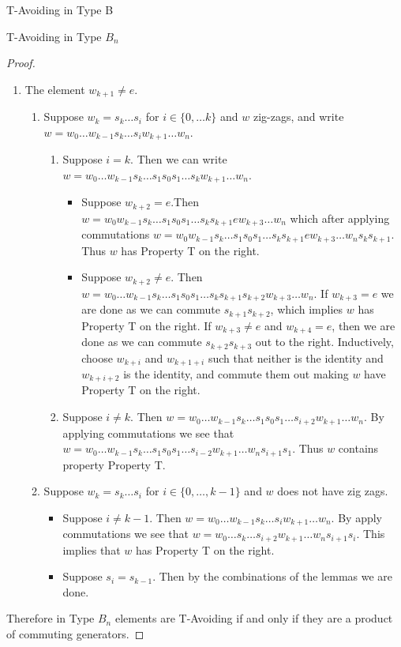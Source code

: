 \documentclass[11pt]{amsart}
\theoremstyle{definition}
\numberwithin{equation}{section}
\renewcommand{\(}{\left(}
\renewcommand{\)}{\right)}
\begin{document}
\begin{section}{T-Avoiding in Type B}
\begin{subsection}{T-Avoiding in Type $B_n$}
\begin{proof}
\begin{enumerate}
\begin{enumerate}
\begin{enumerate}
	\end{enumerate}
	\item The element $w_{k+1} \neq e$.
	\begin{enumerate}
	\item Suppose $w_k=s_k \ldots s_i$ for $i \in \{0, \ldots k\}$ and $w$ zig-zags, and write $w=w_0 \ldots w_{k-1} s_k \ldots s_i w_{k+1} \ldots w_n$.
	\begin{enumerate}
	\item Suppose $i=k$. Then we can write $w=w_0 \ldots w_{k-1} s_k \ldots s_1 s_0 s_1 \ldots s_k w_{k+1} \ldots w_n$.
	\begin{itemize}
	\item Suppose $w_{k+2}=e$.Then $w=w_0 w_{k-1} s_k \ldots s_1 s_0 s_1 \ldots s_k s_{k+1} e w_{k+3} \ldots w_n$ which after applying commutations $w=w_0 w_{k-1} s_k \ldots s_1 s_0 s_1 \ldots s_k s_{k+1} e w_{k+3} \ldots w_n s_k s_{k+1}$. Thus $w$ has Property T on the right.
	\item Suppose $w_{k+2} \neq e$. Then $w=w_0 \ldots w_{k-1} s_k \ldots s_1 s_0 s_1 \ldots s_k s_{k+1} s_{k+2} w_{k+3} \ldots w_n$. If $w_{k+3}=e$ we are done as we can commute $s_{k+1}s_{k+2}$, which implies $w$ has Property T on the right. If $w_{k+3} \neq e$ and $w_{k+4} = e$, then we are done as we can commute $s_{k+2} s_{k+3}$ out to the right. Inductively, choose $w_{k+i}$ and $w_{k+1+i}$  such that neither is the identity and $w_{k+i+2}$ is the identity, and commute them out making $w$ have Property T on the right.
	\end{itemize}
	\item Suppose $i \neq k$. Then $w=w_0 \ldots w_{k-1} s_{k} \ldots s_1 s_0 s_1 \ldots s_{i+2} w_{k+1} \ldots w_n$. By applying commutations we see that $w=w_0 \ldots w_{k-1} s_k \ldots s_1 s_0 s_1 \ldots s_{i-2} w_{k+1} \ldots w_n s_{i+1} s_1$. Thus $w$ contains property Property T.
	\end{enumerate}
	\item Suppose $w_k=s_k \ldots s_i$ for $i \in \{0, \ldots, k-1\}$ and $w$ does not have zig zags.
	\begin{itemize}
	\item Suppose $i \neq k-1$. Then $w=w_0 \ldots w_{k-1} s_k \ldots s_i w_{k+1} \ldots w_n$. By apply commutations we see that $w=w_0 \ldots s_k \ldots s_{i+2} w_{k+1} \ldots w_n s_{i+1} s_i$. This implies that $w$ has Property T on the right.
	\item Suppose $s_i =s_{k-1}$. Then by the combinations of the lemmas we are done. 	
	\end{itemize}
	\end{enumerate}
	\end{enumerate}
	\end{enumerate}
	Therefore in Type $B_n$ elements are T-Avoiding if and only if they are a product of commuting generators.
\end{proof}
\end{subsection}

	
\end{section}




\end{document}
